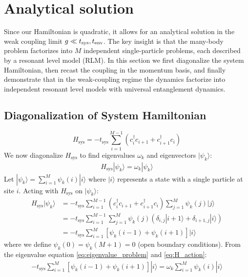 \documentclass[12pt,oneside,openright]{report}
\theoremstyle{definition}
\theoremstyle{plain}
\theoremstyle{remark}
\begin{document}
\section{Analytical solution}
\label{sec:analytical_solution}
Since our Hamiltonian is quadratic, it allows for an analytical solution in the weak coupling 
limit $g \ll t_{\rm sys}, t_{\rm env}$. The key insight is that the many-body problem 
factorizes into $M$ independent single-particle problems, each described by a resonant level model (RLM).
In this section we first diagonalize the system Hamiltonian, then recast the coupling in the momentum basis, and finally demonstrate that in the weak-coupling regime the dynamics factorize into independent resonant level models with universal entanglement dynamics.
\subsection{Diagonalization of System Hamiltonian}
\label{subsec:diagonalization}
\begin{equation}
H_{\text{sys}} = -t_{\text{sys}} \sum_{i=1}^{M-1} \left(c_i^\dagger c_{i+1} + c_{i+1}^\dagger c_i\right)
\label{eq:system_hamiltonian}
\end{equation}
We now diagonalize $H_{\text{sys}}$ to find eigenvalues $\omega_k$ and eigenvectors $|\psi_k\rangle$:
\begin{align}
H_{\text{sys}} |\psi_k\rangle = \omega_k |\psi_k\rangle \label{eq:eigenvalue_problem}
\end{align}
Let $|\psi_k\rangle = \sum_{i=1}^M \psi_k(i) |i\rangle$ where $|i\rangle$ represents a state with a single particle at site $i$.
Acting with $H_{\text{sys}}$ on $|\psi_k\rangle$:
\begin{align}
H_{\text{sys}} |\psi_k\rangle &= -t_{\text{sys}} \sum_{i=1}^{M-1} \left( c_i^\dagger c_{i+1} + c_{i+1}^\dagger c_i \right) \sum_{j=1}^M \psi_k(j) |j\rangle \nonumber\\
&= -t_{\text{sys}} \sum_{i=1}^{M-1} \sum_{j=1}^M \psi_k(j) \left( \delta_{i,j} |i+1\rangle + \delta_{i+1,j} |i\rangle \right) \nonumber\\
&= -t_{\text{sys}} \sum_{i=1}^M \left[ \psi_k(i-1) + \psi_k(i+1) \right] |i\rangle \label{eq:H_action}
\end{align}
where we define $\psi_k(0) = \psi_k(M+1) = 0$ (open boundary conditions).
From the eigenvalue equation \eqref{eq:eigenvalue_problem} and \eqref{eq:H_action}:
\begin{align}
-t_{\text{sys}} \sum_{i=1}^M \left[ \psi_k(i-1) + \psi_k(i+1) \right] |i\rangle = \omega_k \sum_{i=1}^M \psi_k(i) |i\rangle
\end{align}
\end{document}
